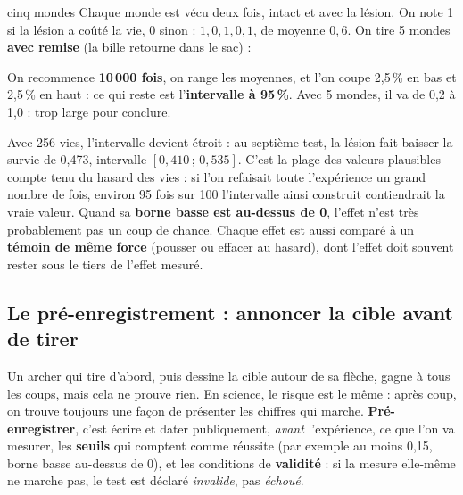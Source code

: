 \documentclass[fontsize=10pt,paper=a4,parskip=half-]{scrartcl}
\newcommand{\q}[1]{\og #1\fg{}}
\newcommand{\pc}{\,\%}
\begin{document}
\begin{calcul}{cinq mondes}
Chaque monde est vécu deux fois, intact et avec la lésion. On note 1 si la lésion a coûté
la vie, 0 sinon : $1, 0, 1, 0, 1$, de moyenne $0,6$. On tire 5 mondes \textbf{avec
remise} (la bille retourne dans le sac) :

\begin{center}
\end{center}
On recommence \textbf{10\,000 fois}, on range les moyennes, et l'on coupe 2,5\pc{} en bas et
2,5\pc{} en haut : ce qui reste est l'\textbf{intervalle à 95\pc}. Avec 5 mondes, il va de
0,2 à 1,0 : trop large pour conclure.
\end{calcul}

Avec 256 vies, l'intervalle devient étroit : au septième test, la lésion fait baisser la
survie de 0,473, intervalle $[0,410\,;\,0,535]$. C'est la plage des valeurs plausibles
compte tenu du hasard des vies : si l'on refaisait toute l'expérience un grand nombre de
fois, environ 95 fois sur 100 l'intervalle ainsi construit contiendrait la vraie valeur.
Quand sa \textbf{borne basse est au-dessus de 0}, l'effet n'est très probablement pas un
coup de chance. Chaque effet est aussi comparé à un \textbf{témoin de même force} (pousser
ou effacer au hasard), dont l'effet doit souvent rester sous le tiers de l'effet mesuré.

\subsection{Le pré-enregistrement : annoncer la cible avant de tirer}
Un archer qui tire d'abord, puis dessine la cible autour de sa flèche, gagne à tous les
coups, mais cela ne prouve rien. En science, le risque est le même : après coup, on trouve
toujours une façon de présenter les chiffres qui \q{marche}. \textbf{Pré-enregistrer},
c'est écrire et dater publiquement, \emph{avant} l'expérience, ce que l'on va mesurer, les
\textbf{seuils} qui comptent comme réussite (par exemple \q{au moins 0,15, borne basse
au-dessus de 0}), et les conditions de \textbf{validité} : si la mesure elle-même ne
marche pas, le test est déclaré \emph{invalide}, pas \emph{échoué}.
\end{document}
